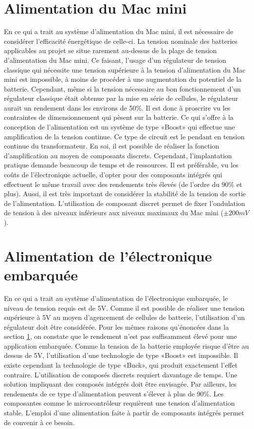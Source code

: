 \section{Alimentation du Mac mini} \label{s:alim_mac_mini}
En ce qui a trait au système d'alimentation du Mac mini, il est nécessaire de considérer l'efficacité énergétique de celle-ci. La tension nominale des batteries applicables au projet se situe rarement au-dessus de la plage de tension d'alimentation du Mac mini. Ce faisant, l'usage d'un régulateur de tension classique qui nécessite une tension supérieure à la tension d'alimentation du Mac mini est impossible, à moins de procéder à une augmentation du potentiel de la batterie. Cependant, même si la tension nécessaire au bon fonctionnement d'un régulateur classique était obtenue par la mise en série de cellules, le régulateur aurait un rendement dans les environs de 50\%. Il est donc à proscrire vu les contraintes de dimensionnement qui pèsent sur la batterie. Ce qui s'offre à la conception de l'alimentation est un système de type «Boost» qui effectue une amplification de la tension continue. Ce type de circuit est le pendant en tension continue du transformateur. En soi, il est possible de réaliser la fonction d'amplification au moyen de composants discrets. Cependant, l'implantation pratique demande beaucoup de temps et de ressources. Il est préférable, vu les coûts de l'électronique actuelle, d'opter pour des composants intégrés qui effectuent le même travail avec des rendements très élevés (de l'ordre du 90\% et plus). Aussi, il est très important de considérer la stabilité de la tension de sortie de l'alimentation. L'utilisation de composant discret permet de fixer l'ondulation de tension à des niveaux inférieurs aux niveaux maximaux du Mac mini ($\pm 200mV$).

\section{Alimentation de l'électronique embarquée}
En ce qui a trait au système d'alimentation de l'électronique embarquée, le niveau de tension requis est de 5V. Comme il est possible de réaliser une tension supérieure à 5V au moyen d'agencement de cellules de batterie, l'utilisation d'un régulateur doit être considérée. Pour les mêmes raisons qu'énoncées dans la section \ref{s:alim_mac_mini}, on constate que le rendement n'est pas suffisamment élevé pour une application embarquée. Comme la tension de la batterie employée risque d'être au dessus de 5V, l'utilisation d'une technologie de type «Boost» est impossible. Il existe cependant la technologie de type «Buck», qui produit exactement l'effet contraire. L'utilisation de composés discrets requiert davantage de temps. Une solution impliquant des composés intégrés doit être envisagée. Par ailleurs, les rendements de ce type d'alimentation peuvent s'élever à plus de 90\%. Les composantes comme le microcontrôleur requièrent une tension d'alimentation stable. L'emploi d'une alimentation faite à partir de composants intégrés permet de convenir à ce besoin.